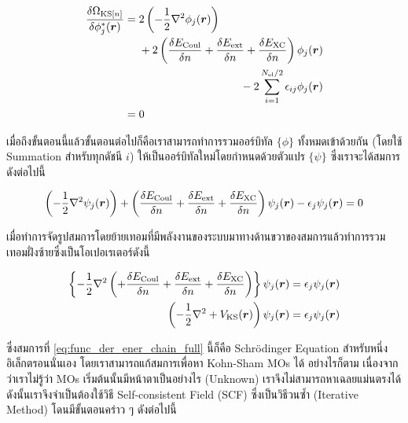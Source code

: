 \begin{align}
    \fdv{\Omega_{\text{KS}[n]}}{\phi^{\ast}_{j}(\bm{r})} 
    &= \begin{multlined}[t]
        2 \left ( -\frac{1}{2}\nabla^{2} \phi_{j}(\bm{r}) \right ) \\
        + 2 \left ( \fdv{E_{\text{Coul}}}{n} + \fdv{E_{\text{ext}}}{n} + \fdv{E_{\text{XC}}}{n} \right ) 
        \phi_{j}(\bm{r}) \\
        - 2 \sum^{N_{\text{el}}/2}_{i=1} \epsilon_{ij} \phi_{j}(\bm{r})
        \end{multlined} \\
    &= 0
\end{align}

เมื่อถึงขั้นตอนนี้แล้วขั้นตอนต่อไปก็คือเราสามารถทำการรวมออร์บิทัล $\{\phi\}$ ทั้งหมดเข้าด้วยกัน (โดยใช้ Summation สำหรับทุกดัชนี $i$) 
ให้เป็นออร์บิทัลใหม่โดยกำหนดด้วยตัวแปร $\{\psi\}$ ซึ่งเราจะได้สมการดังต่อไปนี้

\begin{equation}
    \left ( -\frac{1}{2}\nabla^{2} \psi_{j}(\bm{r}) \right )
    + \left ( \fdv{E_{\text{Coul}}}{n} + \fdv{E_{\text{ext}}}{n} + \fdv{E_{\text{XC}}}{n} \right ) 
    \psi_{j}(\bm{r}) - \epsilon_{j} \psi_{j}(\bm{r})
    = 0
\end{equation}

\noindent เมื่อทำการจัดรูปสมการโดยย้ายเทอมที่มีพลังงานของระบบมาทางด้านขวาของสมการแล้วทำการรวมเทอมฝั่งซ้ายซึ่งเป็นโอเปอเรเตอร์ดังนี้

\begin{align}    
    \left \{ -\frac{1}{2}\nabla^{2} \left (
    + \fdv{E_{\text{Coul}}}{n} + \fdv{E_{\text{ext}}}{n} + \fdv{E_{\text{XC}}}{n} \right ) 
    \right \} \psi_{j}(\bm{r})
    = \epsilon_{j} \psi_{j}(\bm{r}) \nonumber \\
    \left ( -\frac{1}{2}\nabla^{2} + V_{\text{KS}}(\bm{r}) \right ) \psi_{j}(\bm{r})
    = \epsilon_{j} \psi_{j}(\bm{r}) \label{eq:func_der_ener_chain_full}
\end{align}

\noindent ซึ่งสมการที่ \ref{eq:func_der_ener_chain_full} นี้ก็คือ Schr\"{o}dinger Equation สำหรับหนึ่งอิเล็กตรอนนั่นเอง 
โดยเราสามารถแก้สมการเพื่อหา Kohn-Sham MOs ได้ อย่างไรก็ตาม เนื่องจากว่าเราไม่รู้ว่า MOs เริ่มต้นนั้นมีหน้าตาเป็นอย่างไร (Unknown)
เราจึงไม่สามารถหาเฉลยแม่นตรงได้ ดังนั้นเราจึงจำเป็นต้องใช้วิธี Self-consistent Field (SCF) ซึ่งเป็นวิธีวนซ้ำ (Iterative Method) 
โดนมีขั้นตอนคร่าว ๆ ดังต่อไปนี้

